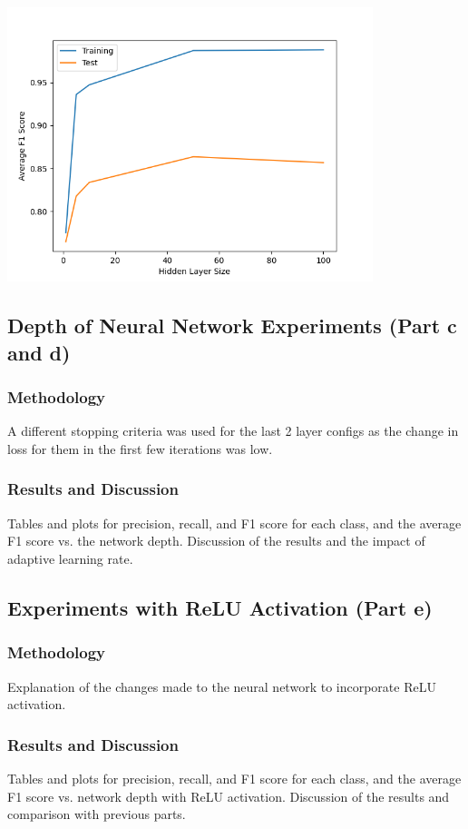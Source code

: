 \documentclass[12pt]{article}
\begin{document}
\begin{center}
    \includegraphics[width=0.8\textwidth]{Assignment 3/q2/(b) f1 vs hidden_size.png}
\end{center}



\subsection{Depth of Neural Network Experiments (Part c and d)}
\subsubsection{Methodology}
A different stopping criteria was used for the last 2 layer configs as the change in loss for them in the first few iterations was low.

\subsubsection{Results and Discussion}
Tables and plots for precision, recall, and F1 score for each class, and the average F1 score vs. the network depth. Discussion of the results and the impact of adaptive learning rate.

\subsection{Experiments with ReLU Activation (Part e)}
\subsubsection{Methodology}
Explanation of the changes made to the neural network to incorporate ReLU activation.

\subsubsection{Results and Discussion}
Tables and plots for precision, recall, and F1 score for each class, and the average F1 score vs. network depth with ReLU activation. Discussion of the results and comparison with previous parts.
\end{document}
